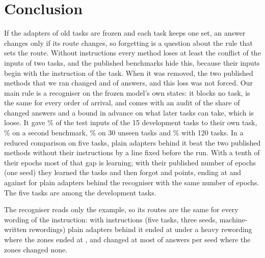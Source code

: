 \section{Conclusion}
\label{sec:conclusion}

If the adapters of old tasks are frozen and each task keeps one set, an answer changes only if its
route changes, so forgetting is a question about the rule that sets the route. Without instructions
every method loses at least the conflict of the inputs of two tasks, and the published benchmarks
hide this, because their inputs begin with the instruction of the task. When it was removed, the
two published methods that we ran changed \AudSeedsGainloraChanged{} and \AudSeedsInfloraChanged{}
of \AudSeedsCompared{} answers, and this loss was not forced. Our main rule is a recogniser on the
frozen model's own states: it blocks no task, is the same for every order of arrival, and comes with
an audit of the share of changed answers and a bound in advance on what later tasks can take, which
is loose. It gave \AudDevLLamOneEnd{}\% of the test inputs of the 15 development tasks to their own
task, \AudScaleLongThreeEnd{}\% on a second benchmark, \AudFreshFourthLEnd{}\% on 30 unseen tasks and
\AudScaleAllHundredTwentyEnd{}\% with 120 tasks. In a reduced comparison on five tasks, plain
adapters behind it beat the two published methods without their instructions by a line fixed before
the run. With a tenth of their epochs most of that gap is learning; with their published number of
epochs (one seed) they learned the tasks and then forgot \AudFullGainloraFTInt{} and
\AudFullInfloraFTInt{} points, ending at \AudFullGainloraAPOne{} and \AudFullInfloraAPOne{} against
\AudFullOursRidgeAPOne{} for plain adapters behind the recogniser with the same number of epochs. The five tasks are among the development tasks.

The recogniser reads only the example, so its routes are the same for every wording of the
instruction: with instructions (five tasks, three seeds, machine-written rewordings)
plain adapters behind it ended at \AudUThreeHeavyRidgeAPOne{} under a heavy rewording
where the zones ended at \AudUThreeHeavyCertAPOne{}, and changed at most \AudUThreeMaxChangedPerSeed{} of
\AudUCompared{} answers per seed where the zones changed none.

